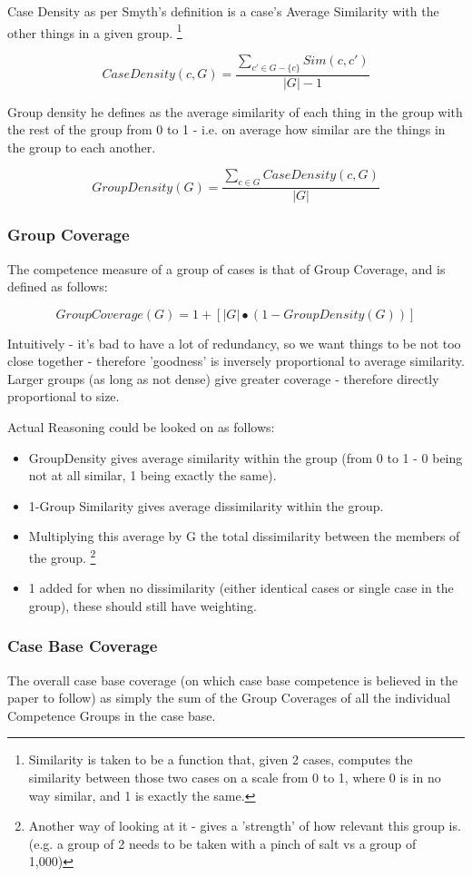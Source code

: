 \documentclass[a4paper,11pt]{report}
\begin{document}
Case Density as per Smyth's definition is a case's Average Similarity with the other things in a given group. \footnote{Similarity is taken to be a function that, given 2 cases, computes the similarity between those two cases on a scale from 0 to 1, where 0 is in no way similar, and 1 is exactly the same.}

\[
CaseDensity(c,G)=\frac{\underset{c'\in G-\{c\}}{\sum}Sim(c,c')}{\left|G\right|-1}
\]

Group density he defines as the average similarity of each thing in the group with the rest of the group from 0 to 1 - i.e. on average how similar are the things in the group to each another.

\[
GroupDensity(G)=\frac{\underset{c\in G}{\sum}CaseDensity(c,G)}{\left|G\right|}
\]

\subsubsection{Group Coverage}
The competence measure of a group of cases is that of Group Coverage, and is defined as follows:

\[
GroupCoverage(G)=1+\left[\left|G\right|\bullet(1-GroupDensity(G))\right]
\]

Intuitively - it's bad to have a lot of redundancy, so we want things to be not too close together - therefore 'goodness' is inversely proportional to average similarity. Larger groups (as long as not dense) give greater coverage - therefore directly proportional to size.

Actual Reasoning could be looked on as follows:
\begin{itemize}
	\item GroupDensity gives average similarity within the group (from 0 to 1 - 0 being not at all similar, 1 being exactly the same).
	\item 1-Group Similarity gives average dissimilarity within the group.
	\item Multiplying this average by G the total dissimilarity between the members of the group. \footnote{Another way of looking at it - gives a 'strength' of how relevant this group is. (e.g. a group of 2 needs to be taken with a pinch of salt vs a group of 1,000)}
	\item 1 added for when no dissimilarity (either identical cases or single case in the group), these should still have weighting.
\end{itemize}

\subsubsection{Case Base Coverage}
The overall case base coverage (on which case base competence is believed in the paper to follow) as simply the sum of the Group Coverages of all the individual Competence Groups in the case base.
\end{document}
